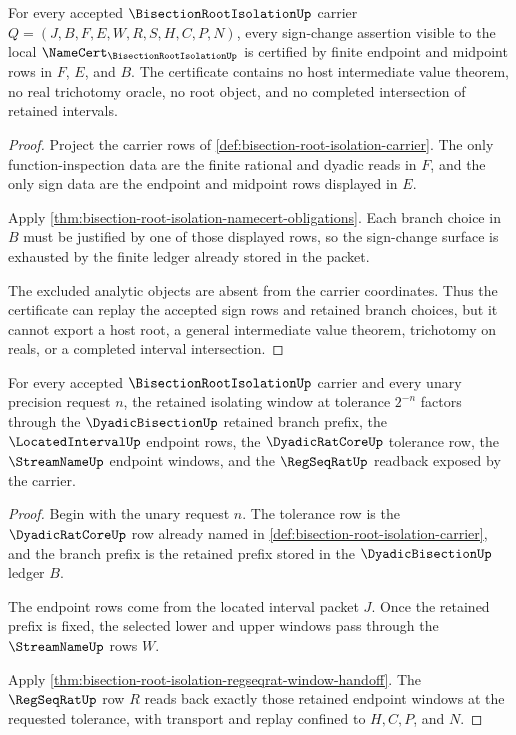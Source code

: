\begin{theorem}
\label{thm:bisection-root-isolation-finite-sign-change-certificate}
For every accepted $\BisectionRootIsolationUp$ carrier $Q=(J,B,F,E,W,R,S,H,C,P,N)$, every sign-change assertion visible to the local $\NameCert_{\BisectionRootIsolationUp}$ is certified by finite endpoint and midpoint rows in $F$, $E$, and $B$. The certificate contains no host intermediate value theorem, no real trichotomy oracle, no root object, and no completed intersection of retained intervals.
\end{theorem}
\begin{proof}
Project the carrier rows of \autoref{def:bisection-root-isolation-carrier}. The only function-inspection data are the finite rational and dyadic reads in $F$, and the only sign data are the endpoint and midpoint rows displayed in $E$.

Apply \autoref{thm:bisection-root-isolation-namecert-obligations}. Each branch choice in $B$ must be justified by one of those displayed rows, so the sign-change surface is exhausted by the finite ledger already stored in the packet.

The excluded analytic objects are absent from the carrier coordinates. Thus the certificate can replay the accepted sign rows and retained branch choices, but it cannot export a host root, a general intermediate value theorem, trichotomy on reals, or a completed interval intersection.
\end{proof}

\begin{theorem}
\label{thm:bisection-root-isolation-retained-window-refinement}
For every accepted $\BisectionRootIsolationUp$ carrier and every unary precision request $n$, the retained isolating window at tolerance $2^{-n}$ factors through the $\DyadicBisectionUp$ retained branch prefix, the $\LocatedIntervalUp$ endpoint rows, the $\DyadicRatCoreUp$ tolerance row, the $\StreamNameUp$ endpoint windows, and the $\RegSeqRatUp$ readback exposed by the carrier.
\end{theorem}
\begin{proof}
Begin with the unary request $n$. The tolerance row is the $\DyadicRatCoreUp$ row already named in \autoref{def:bisection-root-isolation-carrier}, and the branch prefix is the retained prefix stored in the $\DyadicBisectionUp$ ledger $B$.

The endpoint rows come from the located interval packet $J$. Once the retained prefix is fixed, the selected lower and upper windows pass through the $\StreamNameUp$ rows $W$.

Apply \autoref{thm:bisection-root-isolation-regseqrat-window-handoff}. The $\RegSeqRatUp$ row $R$ reads back exactly those retained endpoint windows at the requested tolerance, with transport and replay confined to $H,C,P$, and $N$.
\end{proof}


